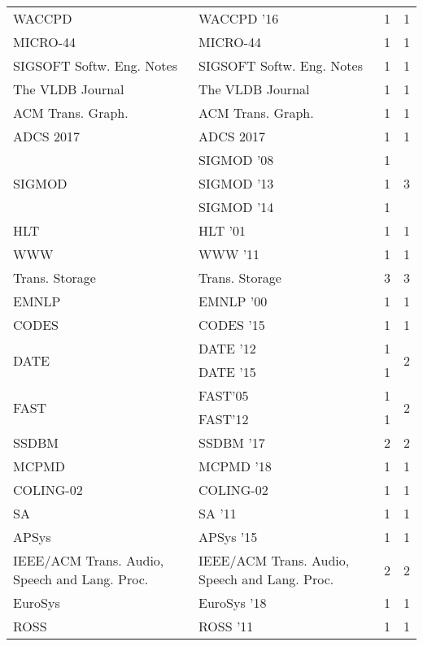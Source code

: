 \begin{table*}[t]
\begin{tabular}{llrr}
\multirow{1}{*}{WACCPD } & WACCPD '16 & 1 & \multirow{1}{*}{1}\\
\multirow{1}{*}{MICRO-44} & MICRO-44 & 1 & \multirow{1}{*}{1}\\
\multirow{1}{*}{SIGSOFT Softw. Eng. Notes} & SIGSOFT Softw. Eng. Notes & 1 & \multirow{1}{*}{1}\\
\multirow{1}{*}{The VLDB Journal} & The VLDB Journal & 1 & \multirow{1}{*}{1}\\
\multirow{1}{*}{ACM Trans. Graph.} & ACM Trans. Graph. & 1 & \multirow{1}{*}{1}\\
\multirow{1}{*}{ADCS 2017} & ADCS 2017 & 1 & \multirow{1}{*}{1}\\
\multirow{3}{*}{SIGMOD } & SIGMOD '08 & 1 & \multirow{3}{*}{3}\\
& SIGMOD '13 & 1 &\\
& SIGMOD '14 & 1 &\\
\multirow{1}{*}{HLT } & HLT '01 & 1 & \multirow{1}{*}{1}\\
\multirow{1}{*}{WWW } & WWW '11 & 1 & \multirow{1}{*}{1}\\
\multirow{1}{*}{Trans. Storage} & Trans. Storage & 3 & \multirow{1}{*}{3}\\
\multirow{1}{*}{EMNLP } & EMNLP '00 & 1 & \multirow{1}{*}{1}\\
\multirow{1}{*}{CODES } & CODES '15 & 1 & \multirow{1}{*}{1}\\
\multirow{2}{*}{DATE } & DATE '12 & 1 & \multirow{2}{*}{2}\\
& DATE '15 & 1 &\\
\multirow{2}{*}{FAST} & FAST'05 & 1 & \multirow{2}{*}{2}\\
& FAST'12 & 1 &\\
\multirow{1}{*}{SSDBM } & SSDBM '17 & 2 & \multirow{1}{*}{2}\\
\multirow{1}{*}{MCPMD } & MCPMD '18 & 1 & \multirow{1}{*}{1}\\
\multirow{1}{*}{COLING-02} & COLING-02 & 1 & \multirow{1}{*}{1}\\
\multirow{1}{*}{SA } & SA '11 & 1 & \multirow{1}{*}{1}\\
\multirow{1}{*}{APSys } & APSys '15 & 1 & \multirow{1}{*}{1}\\
\multirow{1}{*}{IEEE/ACM Trans. Audio, Speech and Lang. Proc.} & IEEE/ACM Trans. Audio, Speech and Lang. Proc. & 2 & \multirow{1}{*}{2}\\
\multirow{1}{*}{EuroSys } & EuroSys '18 & 1 & \multirow{1}{*}{1}\\
\multirow{1}{*}{ROSS } & ROSS '11 & 1 & \multirow{1}{*}{1}\\

\end{tabular}
\end{table*}
